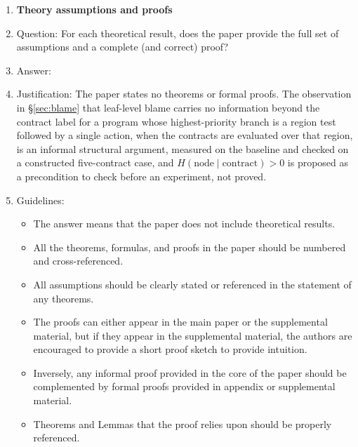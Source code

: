 \begin{enumerate}
\begin{itemize}
        \item If applicable, the authors should discuss possible limitations of their approach to address problems of privacy and fairness.
        \item While the authors might fear that complete honesty about limitations might be used by reviewers as grounds for rejection, a worse outcome might be that reviewers discover limitations that aren't acknowledged in the paper. The authors should use their best judgment and recognize that individual actions in favor of transparency play an important role in developing norms that preserve the integrity of the community. Reviewers will be specifically instructed to not penalize honesty concerning limitations.
    \end{itemize}

\item {\bf Theory assumptions and proofs}
    \item[] Question: For each theoretical result, does the paper provide the full set of assumptions and a complete (and correct) proof?
    \item[] Answer: \answerNA{}
    \item[] Justification: The paper states no theorems or formal proofs. The observation in \S\ref{sec:blame} that leaf-level blame carries no information beyond the contract label for a program whose highest-priority branch is a region test followed by a single action, when the contracts are evaluated over that region, is an informal structural argument, measured on the baseline and checked on a constructed five-contract case, and $H(\mathrm{node}\mid\mathrm{contract}) > 0$ is proposed as a precondition to check before an experiment, not proved.
    \item[] Guidelines:
    \begin{itemize}
        \item The answer \answerNA{} means that the paper does not include theoretical results.
        \item All the theorems, formulas, and proofs in the paper should be numbered and cross-referenced.
        \item All assumptions should be clearly stated or referenced in the statement of any theorems.
        \item The proofs can either appear in the main paper or the supplemental material, but if they appear in the supplemental material, the authors are encouraged to provide a short proof sketch to provide intuition.
        \item Inversely, any informal proof provided in the core of the paper should be complemented by formal proofs provided in appendix or supplemental material.
        \item Theorems and Lemmas that the proof relies upon should be properly referenced.
    \end{itemize}


\end{enumerate}
